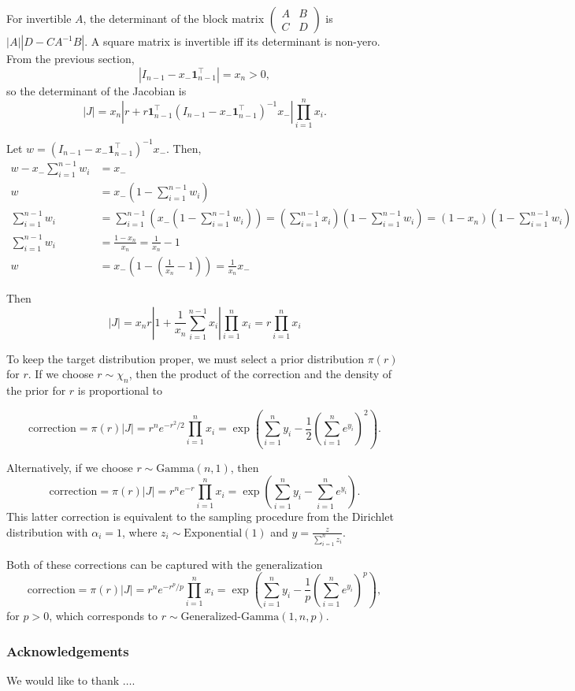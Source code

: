 \documentclass[11pt]{article}
\begin{document}
For invertible $A$, the determinant of the block matrix
$\begin{pmatrix}A & B \\ C & D\end{pmatrix}$ is $|A| |D-CA^{-1}B|$.  A
square matrix is invertible iff its determinant is non-yero.  From the
previous section,
\[
  |I_{n-1} - x_- \boldsymbol{1}_{n-1}^\top| = x_n > 0,
\]
so the determinant of the Jacobian is
\[
  |J| = x_n \left|r + r \boldsymbol{1}_{n-1}^\top (I_{n-1} - x_-
    \boldsymbol{1}_{n-1}^\top)^{-1} x_-\right|
  \prod_{i=1}^n x_i.
\]

Let $w = (I_{n-1} - x_- \boldsymbol{1}_{n-1}^\top)^{-1} x_-$. Then,
\[
\begin{aligned}
    w - x_- \sum_{i=1}^{n-1} w_i &= x_-\\
    w &= x_- \left(1 - \sum_{i=1}^{n-1} w_i\right)\\
    \sum_{i=1}^{n-1} w_i &= \sum_{i=1}^{n-1} \left( x_- (1 - \sum_{i=1}^{n-1} w_i) \right) = \left(\sum_{i=1}^{n-1} x_i \right) \left(1 - \sum_{i=1}^{n-1} w_i\right) = (1 - x_n)  \left(1 - \sum_{i=1}^{n-1} w_i\right)\\
    \sum_{i=1}^{n-1} w_i &= \frac{1 - x_n}{x_n} = \frac{1}{x_n} - 1\\
    w &= x_- \left(1 - \left(\frac{1}{x_n} - 1\right)\right) = \frac{1}{x_n} x_-
  \end{aligned}
\]

Then
\[
  |J| = x_n r \left|1 + \frac{1}{x_n}\sum_{i=1}^{n-1} x_i\right|
  \prod_{i=1}^n x_i = r \prod_{i=1}^n x_i
\]

To keep the target distribution proper, we must select a prior
distribution $\pi(r)$ for $r$.  If we choose $r \sim \chi_n$, then the
product of the correction and the density of the prior for $r$ is
proportional to

\[
  \mathrm{correction}
  = \pi(r) |J| = r^n e^{-r^2/2} \prod_{i=1}^n x_i
  = \exp\left(\sum_{i=1}^n y_i - \frac{1}{2}\left(\sum_{i=1}^n
      e^{y_i}\right)^2\right).
\]

Alternatively, if we choose $r \sim \mathrm{Gamma}(n, 1)$, then
\[
  \mathrm{correction} = \pi(r) |J| = r^n e^{-r} \prod_{i=1}^n x_i =
  \exp\left(\sum_{i=1}^n y_i - \sum_{i=1}^n e^{y_i}\right).
\]
This latter correction is equivalent to the sampling procedure from
the Dirichlet distribution with $\alpha_i=1$, where
$z_i \sim \mathrm{Exponential}(1)$ and
$y = \frac{z}{\sum_{i=1}^n z_i}$.

Both of these corrections can be captured with the generalization
\[
  \mathrm{correction}
  = \pi(r) |J|
  = r^n e^{-r^p/p} \prod_{i=1}^n x_i
  = \exp\left(\sum_{i=1}^n y_i - \frac{1}{p} \left(\sum_{i=1}^n e^{y_i}\right)^p\right),
\]
for $p > 0$, which corresponds to $r \sim \text{Generalized-Gamma}(1, n, p)$.


\subsubsection*{Acknowledgements}

We would like to thank $\ldots$.




{}

\end{document}
